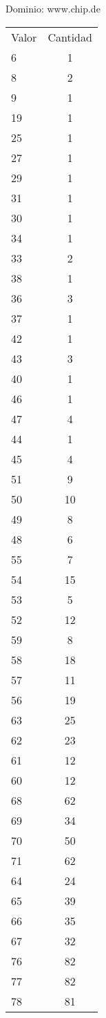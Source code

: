 Dominio: www.chip.de\\
\begin{tabular}{| l | c |}
 Valor & Cantidad\\
 6 & 1\\
 8 & 2\\
 9 & 1\\
 19 & 1\\
 25 & 1\\
 27 & 1\\
 29 & 1\\
 31 & 1\\
 30 & 1\\
 34 & 1\\
 33 & 2\\
 38 & 1\\
 36 & 3\\
 37 & 1\\
 42 & 1\\
 43 & 3\\
 40 & 1\\
 46 & 1\\
 47 & 4\\
 44 & 1\\
 45 & 4\\
 51 & 9\\
 50 & 10\\
 49 & 8\\
 48 & 6\\
 55 & 7\\
 54 & 15\\
 53 & 5\\
 52 & 12\\
 59 & 8\\
 58 & 18\\
 57 & 11\\
 56 & 19\\
 63 & 25\\
 62 & 23\\
 61 & 12\\
 60 & 12\\
 68 & 62\\
 69 & 34\\
 70 & 50\\
 71 & 62\\
 64 & 24\\
 65 & 39\\
 66 & 35\\
 67 & 32\\
 76 & 82\\
 77 & 82\\
 78 & 81\\

\end{tabular}
